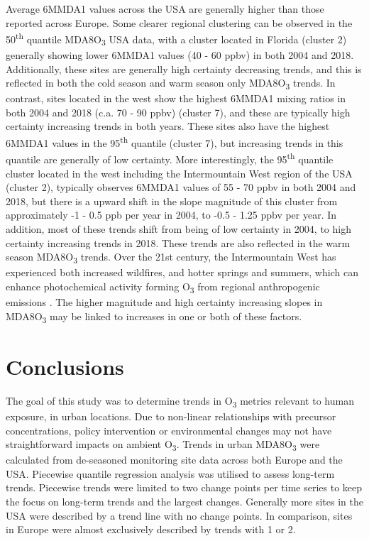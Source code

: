 \documentclass[journal abbreviation, manuscript]{copernicus}
\begin{document}
Average 6MMDA1 values across the USA are generally higher than those reported across Europe. Some clearer regional clustering can be observed in the 50\textsuperscript{th} quantile MDA8O\textsubscript{3} USA data, with a cluster located in Florida (cluster 2) generally showing lower 6MMDA1 values (40 - 60 ppbv) in both 2004 and 2018. Additionally, these sites are generally high certainty decreasing trends, and this is reflected in both the cold season and warm season only MDA8O\textsubscript{3} trends. In contrast, sites located in the west show the highest 6MMDA1 mixing ratios in both 2004 and 2018 (c.a. 70 - 90 ppbv) (cluster 7), and these are typically high certainty increasing trends in both years. These sites also have the highest 6MMDA1 values in the 95\textsuperscript{th} quantile (cluster 7), but increasing trends in this quantile are generally of low certainty. More interestingly, the 95\textsuperscript{th} quantile cluster located in the west including the Intermountain West region of the USA (cluster 2), typically observes 6MMDA1 values of 55 - 70 ppbv in both 2004 and 2018, but there is a upward shift in the slope magnitude of this cluster from approximately -1 - 0.5 ppb per year in 2004, to -0.5 - 1.25 ppbv per year. In addition, most of these trends shift from being of low certainty in 2004, to high certainty increasing trends in 2018. These trends are also reflected in the warm season MDA8O\textsubscript{3} trends. Over the 21st century, the Intermountain West has experienced both increased wildfires, and hotter springs and summers, which can enhance photochemical activity forming O\textsubscript{3} from regional anthropogenic emissions \citep{Lin2017, Li2021, Peterson2021, Iglesias2022}. The higher magnitude and high certainty increasing slopes in MDA8O\textsubscript{3} may be linked to increases in one or both of these factors.

\section{Conclusions}  %

The goal of this study was to determine trends in O\textsubscript{3} metrics relevant to human exposure, in urban locations. Due to non-linear relationships with precursor concentrations, policy intervention or environmental changes  may not have straightforward impacts on ambient O\textsubscript{3}. Trends in urban MDA8O\textsubscript{3} were calculated from de-seasoned monitoring site data across both Europe and the USA. Piecewise quantile regression analysis was utilised to assess long-term trends. Piecewise trends were limited to two change points per time series to keep the focus on long-term trends and the largest changes. Generally more sites in the USA were described by a trend line with no change points. In comparison, sites in Europe were almost exclusively described by trends with 1 or 2. 
\end{document}
